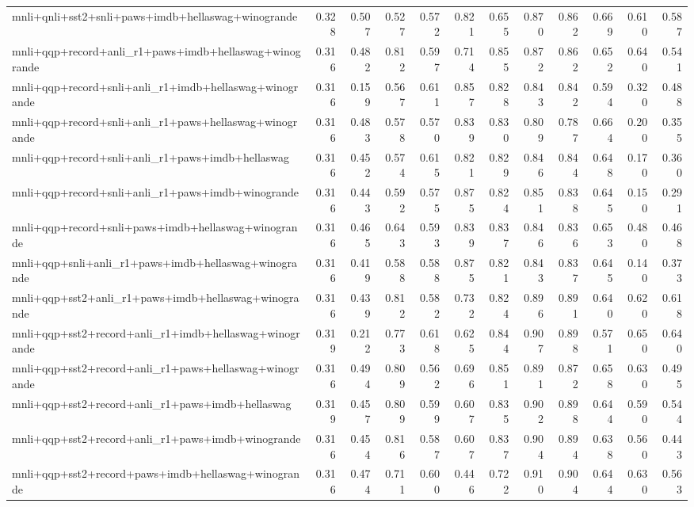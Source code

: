 \begin{table}[t]
\begin{tabular}{lrrrrrrrrrrr}
    mnli+qnli+sst2+snli+paws+imdb+hellaswag+winogrande & 0.328 & 0.507 & 0.527 & 0.572 & 0.821 & 0.655 & 0.870 & 0.862 & 0.669 & 0.610 & 0.587 \\
    mnli+qqp+record+anli\_r1+paws+imdb+hellaswag+winogrande & 0.316 & 0.482 & 0.812 & 0.597 & 0.714 & 0.855 & 0.872 & 0.862 & 0.652 & 0.640 & 0.541 \\
    mnli+qqp+record+snli+anli\_r1+imdb+hellaswag+winogrande & 0.316 & 0.159 & 0.567 & 0.611 & 0.857 & 0.828 & 0.843 & 0.842 & 0.594 & 0.320 & 0.488 \\
    mnli+qqp+record+snli+anli\_r1+paws+hellaswag+winogrande & 0.316 & 0.483 & 0.578 & 0.570 & 0.839 & 0.830 & 0.809 & 0.787 & 0.664 & 0.200 & 0.355 \\
    mnli+qqp+record+snli+anli\_r1+paws+imdb+hellaswag & 0.316 & 0.452 & 0.574 & 0.615 & 0.821 & 0.829 & 0.846 & 0.844 & 0.648 & 0.170 & 0.360 \\
    mnli+qqp+record+snli+anli\_r1+paws+imdb+winogrande & 0.316 & 0.443 & 0.592 & 0.575 & 0.875 & 0.824 & 0.851 & 0.838 & 0.645 & 0.150 & 0.291 \\
    mnli+qqp+record+snli+paws+imdb+hellaswag+winogrande & 0.316 & 0.465 & 0.643 & 0.593 & 0.839 & 0.837 & 0.846 & 0.836 & 0.653 & 0.480 & 0.468 \\
    mnli+qqp+snli+anli\_r1+paws+imdb+hellaswag+winogrande & 0.316 & 0.419 & 0.588 & 0.588 & 0.875 & 0.821 & 0.843 & 0.837 & 0.645 & 0.140 & 0.373 \\
    mnli+qqp+sst2+anli\_r1+paws+imdb+hellaswag+winogrande & 0.316 & 0.439 & 0.812 & 0.582 & 0.732 & 0.824 & 0.896 & 0.891 & 0.640 & 0.620 & 0.618 \\
    mnli+qqp+sst2+record+anli\_r1+imdb+hellaswag+winogrande & 0.319 & 0.212 & 0.773 & 0.618 & 0.625 & 0.844 & 0.907 & 0.898 & 0.571 & 0.650 & 0.640 \\
    mnli+qqp+sst2+record+anli\_r1+paws+hellaswag+winogrande & 0.316 & 0.494 & 0.809 & 0.562 & 0.696 & 0.851 & 0.891 & 0.872 & 0.658 & 0.630 & 0.495 \\
    mnli+qqp+sst2+record+anli\_r1+paws+imdb+hellaswag & 0.319 & 0.457 & 0.809 & 0.599 & 0.607 & 0.835 & 0.902 & 0.898 & 0.644 & 0.590 & 0.544 \\
    mnli+qqp+sst2+record+anli\_r1+paws+imdb+winogrande & 0.316 & 0.454 & 0.816 & 0.587 & 0.607 & 0.837 & 0.904 & 0.894 & 0.638 & 0.560 & 0.443 \\
    mnli+qqp+sst2+record+paws+imdb+hellaswag+winogrande & 0.316 & 0.474 & 0.711 & 0.600 & 0.446 & 0.722 & 0.910 & 0.904 & 0.644 & 0.630 & 0.563 \\

\end{tabular}
\end{table}
